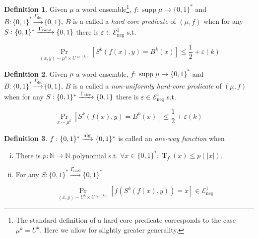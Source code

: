 \documentclass{article}
\numberwithin{equation}{section}
\theoremstyle{definition}
\newtheorem{definition}{Definition}[section]
\theoremstyle{plain}
\newcommand{\Words}{{\{ 0, 1 \}^*}}
\newcommand{\Bool}{\{0,1\}}
\DeclareMathOperator{\Supp}{supp}
\DeclareMathOperator{\Prb}{Pr}
\DeclareMathOperator{\T}{T}
\DeclareMathOperator{\R}{r}
\newcommand{\Nats}{\mathbb{N}}
\newcommand{\Abs}[1]{\lvert #1 \rvert}
\newcommand{\Fall}{\mathcal{E}}
\newcommand{\Alg}{\xrightarrow{\textnormal{alg}}}
\begin{document}
\begin{samepage}
\begin{definition}

Given $\mu$ a word ensemble\footnote{The standard definition of a hard-core predicate corresponds to the case $\mu^k=U^k$. Here we allow for slightly greater generality.}, $f: \Supp \mu \rightarrow \Words$ and ${B: \Words \xrightarrow{\Gamma_{\text{det}}} \Bool}$, $B$ is a called a \emph{hard-core predicate} of $(\mu,f)$ when for any $S: \Words \xrightarrow{\Gamma_{\textnormal{rand}}} \Bool$ there is $\varepsilon \in \Fall_{\text{neg}}^1$ s.t. 

\begin{equation}
\Prb_{(x,y) \sim \mu^k \times U^{\R_S(k)}}[S^k(f(x),y)=B^k(x)] \leq \frac{1}{2} + \varepsilon(k)
\end{equation}

\end{definition}
\end{samepage}

\begin{samepage}
\begin{definition}

Given $\mu$ a word ensemble, $f: \Supp \mu \rightarrow \Words$ and ${B: \Words \xrightarrow{\Gamma_{\text{det}}} \Bool}$, $B$ is a called a \emph{non-uniformly hard-core predicate} of $(\mu,f)$ when for any ${S: \Words \xrightarrow{\Gamma_{\textnormal{circ}}} \Bool}$ there is $\varepsilon \in \Fall_{\text{neg}}^1$ s.t. 

\begin{equation}
\Prb_{x \sim \mu^k}[S^k(f(x),y)=B^k(x)] \leq \frac{1}{2} + \varepsilon(k)
\end{equation}

\end{definition}
\end{samepage}

\begin{samepage}
\begin{definition}

$f: \Words \Alg \Words$ is called an \emph{one-way function}
when

\begin{enumerate}[(i)]

\item There is $p: \Nats \rightarrow \Nats$ polynomial s.t. $\forall x \in \Words: \T_f(x) \leq p(\Abs{x})$.

\item For any $S: \Words \xrightarrow{\Gamma_{\text{rand}}} \Words$

\begin{equation}
\Prb_{(x,y) \sim U^k \times U^{\R_S(k)}}[f(S^k(f(x),y))=x] \in \Fall_{\text{neg}}^1
\end{equation}

\end{enumerate}

\end{definition}
\end{samepage}
\end{document}
